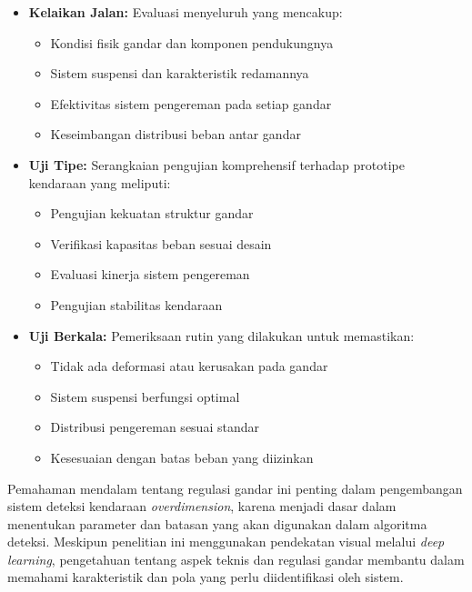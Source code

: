 \begin{itemize}[nolistsep]
  \item \textbf{Kelaikan Jalan:} Evaluasi menyeluruh yang mencakup:
  \begin{itemize}[nolistsep]
    \item Kondisi fisik gandar dan komponen pendukungnya
    \item Sistem suspensi dan karakteristik redamannya
    \item Efektivitas sistem pengereman pada setiap gandar
    \item Keseimbangan distribusi beban antar gandar
  \end{itemize}
  
  \item \textbf{Uji Tipe:} Serangkaian pengujian komprehensif terhadap prototipe kendaraan \parencite*{kemenhub2016} yang meliputi:
  \begin{itemize}[nolistsep]
    \item Pengujian kekuatan struktur gandar
    \item Verifikasi kapasitas beban sesuai desain
    \item Evaluasi kinerja sistem pengereman
    \item Pengujian stabilitas kendaraan
  \end{itemize}
  
  \item \textbf{Uji Berkala:} Pemeriksaan rutin yang dilakukan untuk memastikan:
  \begin{itemize}[nolistsep]
    \item Tidak ada deformasi atau kerusakan pada gandar
    \item Sistem suspensi berfungsi optimal
    \item Distribusi pengereman sesuai standar
    \item Kesesuaian dengan batas beban yang diizinkan
  \end{itemize}
\end{itemize}

Pemahaman mendalam tentang regulasi gandar ini penting dalam pengembangan sistem deteksi kendaraan \emph{overdimension}, karena menjadi dasar dalam menentukan parameter dan batasan yang akan digunakan dalam algoritma deteksi. Meskipun penelitian ini menggunakan pendekatan visual melalui \emph{deep learning}, pengetahuan tentang aspek teknis dan regulasi gandar membantu dalam memahami karakteristik dan pola yang perlu diidentifikasi oleh sistem.

